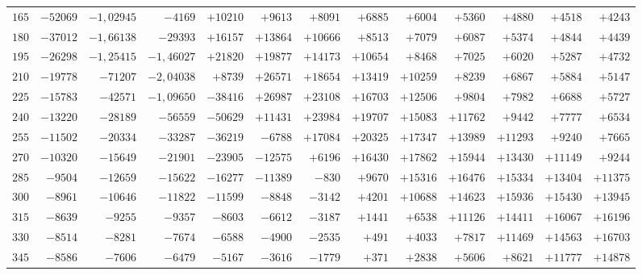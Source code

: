 \begin{landscape}
\begin{center}
\begin{tabular}{@{}r|*{11}{r|}r@{}}
\(165\) & \(-52069\) & \(-1{,}02945\) & \(-4169\) & \(+10210\) & \(+9613\) & \(+8091\) & \(+6885\) & \(+6004\) & \(+5360\) & \(+4880\) & \(+4518\) & \(+4243\)\\
\(180\) & \(-37012\) & \(-1{,}66138\) & \(-29393\) & \(+16157\) & \(+13864\) & \(+10666\) & \(+8513\) & \(+7079\) & \(+6087\) & \(+5374\) & \(+4844\) & \(+4439\)\\
\(195\) & \(-26298\) & \(-1{,}25415\) & \(-1{,}46027\) & \(+21820\) & \(+19877\) & \(+14173\) & \(+10654\) & \(+8468\) & \(+7025\) & \(+6020\) & \(+5287\) & \(+4732\)\\
\(210\) & \(-19778\) & \(-71207\) & \(-2{,}04038\) & \(+8739\) & \(+26571\) & \(+18654\) & \(+13419\) & \(+10259\) & \(+8239\) & \(+6867\) & \(+5884\) & \(+5147\)\\
\(225\) & \(-15783\) & \(-42571\) & \(-1{,}09650\) & \(-38416\) & \(+26987\) & \(+23108\) & \(+16703\) & \(+12506\) & \(+9804\) & \(+7982\) & \(+6688\) & \(+5727\)\\
\(240\) & \(-13220\) & \(-28189\) & \(-56559\) & \(-50629\) & \(+11431\) & \(+23984\) & \(+19707\) & \(+15083\) & \(+11762\) & \(+9442\) & \(+7777\) & \(+6534\)\\
\(255\) & \(-11502\) & \(-20334\) & \(-33287\) & \(-36219\) & \(-6788\) & \(+17084\) & \(+20325\) & \(+17347\) & \(+13989\) & \(+11293\) & \(+9240\) & \(+7665\)\\
\(270\) & \(-10320\) & \(-15649\) & \(-21901\) & \(-23905\) & \(-12575\) & \(+6196\) & \(+16430\) & \(+17862\) & \(+15944\) & \(+13430\) & \(+11149\) & \(+9244\)\\
\(285\) & \(-9504\) & \(-12659\) & \(-15622\) & \(-16277\) & \(-11389\) & \(-830\) & \(+9670\) & \(+15316\) & \(+16476\) & \(+15334\) & \(+13404\) & \(+11375\)\\
\(300\) & \(-8961\) & \(-10646\) & \(-11822\) & \(-11599\) & \(-8848\) & \(-3142\) & \(+4201\) & \(+10688\) & \(+14623\) & \(+15936\) & \(+15430\) & \(+13945\)\\
\(315\) & \(-8639\) & \(-9255\) & \(-9357\) & \(-8603\) & \(-6612\) & \(-3187\) & \(+1441\) & \(+6538\) & \(+11126\) & \(+14411\) & \(+16067\) & \(+16196\)\\
\(330\) & \(-8514\) & \(-8281\) & \(-7674\) & \(-6588\) & \(-4900\) & \(-2535\) & \(+491\) & \(+4033\) & \(+7817\) & \(+11469\) & \(+14563\) & \(+16703\)\\
\(345\) & \(-8586\) & \(-7606\) & \(-6479\) & \(-5167\) & \(-3616\) & \(-1779\) & \(+371\) & \(+2838\) & \(+5606\) & \(+8621\) & \(+11777\) & \(+14878\)\\

\end{tabular}
\end{center}
\end{landscape}
